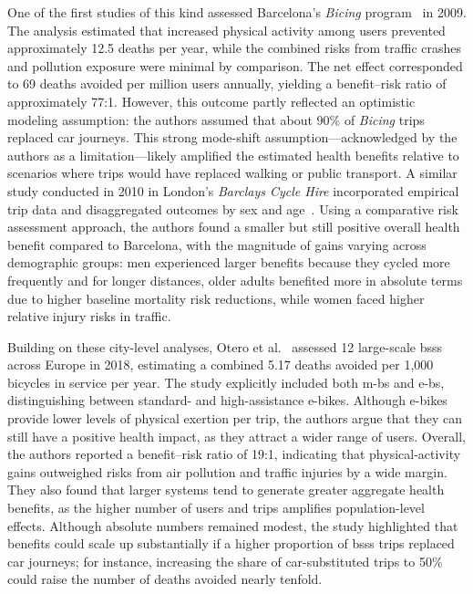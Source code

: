     One of the first studies of this kind assessed Barcelona’s \textit{Bicing} program~\cite{Rojas-Rueda2011} in 2009. The analysis estimated that increased physical activity among users prevented approximately 12.5 deaths per year, while the combined risks from traffic crashes and pollution exposure were minimal by comparison. The net effect corresponded to 69 deaths avoided per million users annually, yielding a benefit–risk ratio of approximately 77:1. However, this outcome partly reflected an optimistic modeling assumption: the authors assumed that about 90\% of \textit{Bicing} trips replaced car journeys. This strong mode-shift assumption—acknowledged by the authors as a limitation—likely amplified the estimated health benefits relative to scenarios where trips would have replaced walking or public transport. A similar study conducted in 2010 in London’s \textit{Barclays Cycle Hire} incorporated empirical trip data and disaggregated outcomes by sex and age~\cite{Woodcock2014}. Using a comparative risk assessment approach, the authors found a smaller but still positive overall health benefit compared to Barcelona, with the magnitude of gains varying across demographic groups: men experienced larger benefits because they cycled more frequently and for longer distances, older adults benefited more in absolute terms due to higher baseline mortality risk reductions, while women faced higher relative injury risks in traffic.     
    
    Building on these city-level analyses, Otero et al.~\cite{Otero2018} assessed 12 large-scale \acp{bss} across Europe in 2018, estimating a combined 5.17 deaths avoided per 1,000 bicycles in service per year. The study explicitly included both \acp{m-b} and \acp{e-b}, distinguishing between standard- and high-assistance e-bikes. Although e-bikes provide lower levels of physical exertion per trip, the authors argue that they can still have a positive health impact, as they attract a wider range of users. Overall, the authors reported a benefit–risk ratio of 19:1, indicating that physical-activity gains outweighed risks from air pollution and traffic injuries by a wide margin. They also found that larger systems tend to generate greater aggregate health benefits, as the higher number of users and trips amplifies population-level effects. Although absolute numbers remained modest, the study highlighted that benefits could scale up substantially if a higher proportion of \acp{bss} trips replaced car journeys; for instance, increasing the share of car-substituted trips to 50\% could raise the number of deaths avoided nearly tenfold.
    

